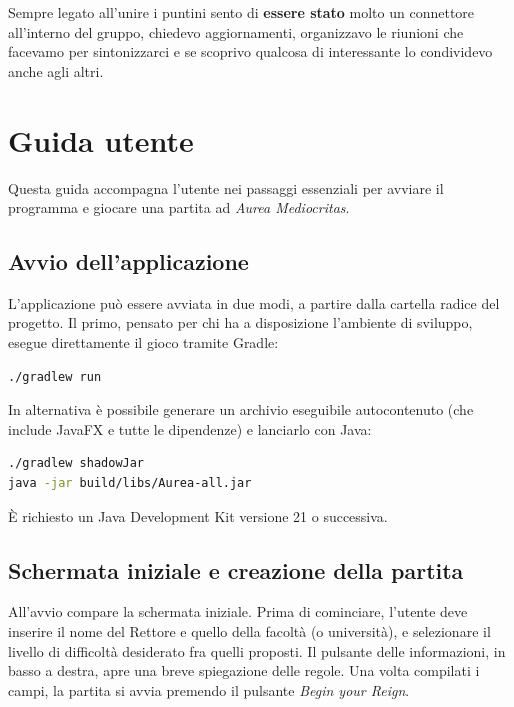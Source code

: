 \documentclass[11pt, a4paper, oneside]{report}
\begin{document}
Sempre legato all'unire i puntini sento di \textbf{essere stato} molto un connettore all'interno del gruppo, chiedevo aggiornamenti, organizzavo le riunioni che facevamo per sintonizzarci e se scoprivo qualcosa di interessante lo condividevo anche agli altri.

\appendix

\chapter{Guida utente}
Questa guida accompagna l'utente nei passaggi essenziali per avviare il
programma e giocare una partita ad \textit{Aurea Mediocritas}.

\section{Avvio dell'applicazione}

L'applicazione può essere avviata in due modi, a partire dalla cartella radice
del progetto. Il primo, pensato per chi ha a disposizione l'ambiente di
sviluppo, esegue direttamente il gioco tramite Gradle:
\begin{lstlisting}[language=bash]
./gradlew run
\end{lstlisting}
In alternativa è possibile generare un archivio eseguibile autocontenuto (che
include JavaFX e tutte le dipendenze) e lanciarlo con Java:
\begin{lstlisting}[language=bash]
./gradlew shadowJar
java -jar build/libs/Aurea-all.jar
\end{lstlisting}
È richiesto un Java Development Kit versione 21 o successiva.

\section{Schermata iniziale e creazione della partita}

All'avvio compare la schermata iniziale. Prima di cominciare, l'utente deve
inserire il nome del Rettore e quello della facoltà (o università), e
selezionare il livello di difficoltà desiderato fra quelli proposti. Il
pulsante delle informazioni, in basso a destra, apre una breve spiegazione
delle regole. Una volta compilati i campi, la partita si avvia premendo il
pulsante \textit{Begin your Reign}.
\end{document}
